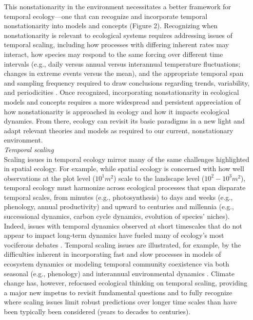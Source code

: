 \documentclass[11pt,a4paper,oneside]{article}
\begin{document}
This nonstationarity in the environment necessitates a better framework for temporal ecology---one that can recognize and incorporate temporal nonstationarity into models and concepts (Figure 2). Recognizing when nonstationarity is relevant to ecological systems requires addressing issues of temporal scaling, including how processes with differing inherent rates may interact, how species may respond to the same forcing over different time intervals (e.g., daily versus annual versus interannual temperature fluctuations; changes in extreme events versus the mean), and the appropriate temporal span and sampling frequency required to draw conclusions regarding trends, variability, and periodicities \citep[e.g.,][]{delcourt1983}. Once recognized, incorporating nonstationarity in ecological models and concepts requires a more widespread and persistent appreciation of how nonstationarity is approached in ecology and how it impacts ecological dynamics. From there, ecology can revisit its basic paradigms in a new light and adapt relevant theories and models as required to our current, nonstationary environment. \\

\noindent \emph{Temporal scaling}\\
\noindent Scaling issues in temporal ecology mirror many of the same challenges highlighted in spatial ecology. For example, while spatial ecology is concerned with how well observations at the plot level ($10^{1}m^2$) scale to the landscape level ($10^{2}-10^{3}m^2$), temporal ecology must harmonize across ecological processes that span disparate temporal scales, from minutes (e.g., photosynthesis) to days and weeks (e.g., phenology, annual productivity) and upward to centuries and millennia (e.g., successional dynamics, carbon cycle dynamics, evolution of species' niches). Indeed, issues with temporal dynamics observed at short timescales that do not appear to impact long-term dynamics have fueled many of ecology's most vociferous debates \citep{wiens1986}. Temporal scaling issues are illustrated, for example, by the difficulties inherent in incorporating fast and slow processes in models of ecosystem dynamics \citep{Carpenter2000} or modeling temporal community coexistence via both seasonal (e.g., phenology) and interannual environmental dynamics \citep{Chesson:1997dz}. Climate change has, however, refocused ecological thinking on temporal scaling, providing a major new impetus to revisit fundamental questions and to fully recognize where scaling issues limit robust predictions over longer time scales than have been typically been considered (years to decades to centuries).
\end{document}
